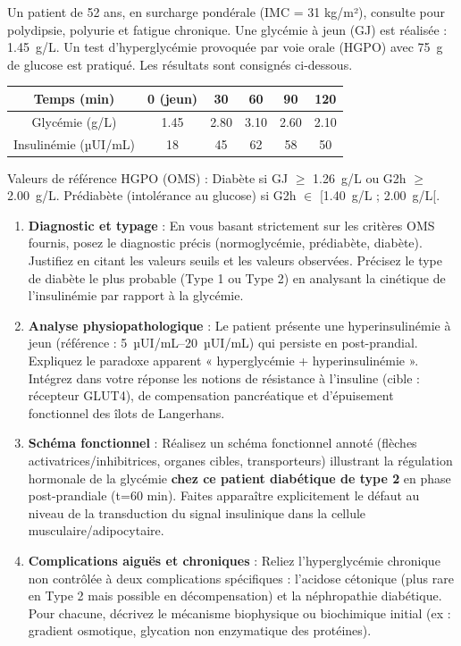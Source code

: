 \documentclass[11pt]{article}
\begin{document}
\begin{exercice}
Un patient de 52 ans, en surcharge pondérale (IMC = 31 kg/m²), consulte pour polydipsie, polyurie et fatigue chronique. Une glycémie à jeun (GJ) est réalisée : \SI{1.45}{g/L}. Un test d'hyperglycémie provoquée par voie orale (HGPO) avec \SI{75}{g} de glucose est pratiqué. Les résultats sont consignés ci-dessous.

\begin{center}
\begin{tabular}{|c|c|c|c|c|c|}
\hline
Temps (min) & 0 (jeun) & 30 & 60 & 90 & 120 \\
\hline
Glycémie (g/L) & 1.45 & 2.80 & 3.10 & 2.60 & 2.10 \\
\hline
Insulinémie (µUI/mL) & 18 & 45 & 62 & 58 & 50 \\
\hline
\end{tabular}
\end{center}
Valeurs de référence HGPO (OMS) : Diabète si GJ $\ge$ \SI{1.26}{g/L} ou G2h $\ge$ \SI{2.00}{g/L}. Prédiabète (intolérance au glucose) si G2h $\in$ [\SI{1.40}{g/L} ; \SI{2.00}{g/L}[.

\begin{enumerate}
    \item \textbf{Diagnostic et typage} : En vous basant strictement sur les critères OMS fournis, posez le diagnostic précis (normoglycémie, prédiabète, diabète). Justifiez en citant les valeurs seuils et les valeurs observées. Précisez le type de diabète le plus probable (Type 1 ou Type 2) en analysant la cinétique de l'insulinémie par rapport à la glycémie.
    \item \textbf{Analyse physiopathologique} : Le patient présente une hyperinsulinémie à jeun (référence : \SIrange{5}{20}{µUI/mL}) qui persiste en post-prandial. Expliquez le paradoxe apparent « hyperglycémie + hyperinsulinémie ». Intégrez dans votre réponse les notions de résistance à l'insuline (cible : récepteur GLUT4), de compensation pancréatique et d'épuisement fonctionnel des îlots de Langerhans.
    \item \textbf{Schéma fonctionnel} : Réalisez un schéma fonctionnel annoté (flèches activatrices/inhibitrices, organes cibles, transporteurs) illustrant la régulation hormonale de la glycémie \textbf{chez ce patient diabétique de type 2} en phase post-prandiale (t=60 min). Faites apparaître explicitement le défaut au niveau de la transduction du signal insulinique dans la cellule musculaire/adipocytaire.
    \item \textbf{Complications aiguës et chroniques} : Reliez l'hyperglycémie chronique non contrôlée à deux complications spécifiques : l'acidose cétonique (plus rare en Type 2 mais possible en décompensation) et la néphropathie diabétique. Pour chacune, décrivez le mécanisme biophysique ou biochimique initial (ex : gradient osmotique, glycation non enzymatique des protéines).
\end{enumerate}
\end{exercice}
\end{document}
